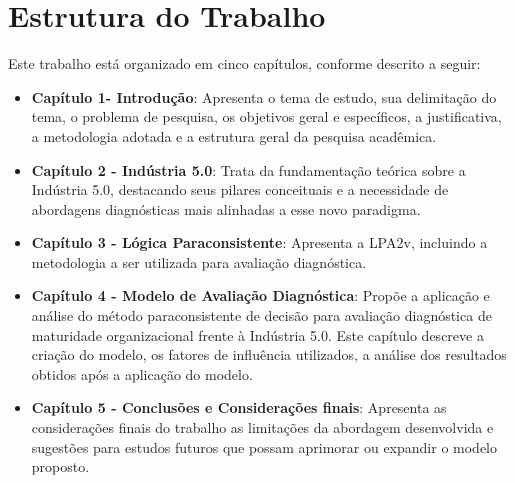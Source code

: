 \section{Estrutura do Trabalho}

Este trabalho está organizado em cinco capítulos, conforme descrito a seguir:

\begin{itemize}
    \item \textbf{Capítulo 1- Introdução}: Apresenta o tema de estudo, sua delimitação do tema, o problema de pesquisa, os objetivos geral e específicos, a justificativa, a metodologia adotada e a estrutura geral da pesquisa acadêmica.
    
    \item \textbf{Capítulo 2 - Indústria 5.0}: Trata da fundamentação teórica sobre a Indústria 5.0, destacando seus pilares conceituais e a necessidade de abordagens diagnósticas mais alinhadas a esse novo paradigma.
    
    \item \textbf{Capítulo 3 - Lógica Paraconsistente}: Apresenta a \gls{LPA2v}, incluindo a metodologia a ser utilizada para avaliação diagnóstica.
    
    \item \textbf{Capítulo 4 - Modelo de Avaliação Diagnóstica}: Propõe a aplicação e análise do método paraconsistente de decisão para avaliação diagnóstica de maturidade organizacional frente à Indústria 5.0.
    Este capítulo descreve a criação do modelo, os fatores de influência utilizados, a análise dos resultados obtidos após a aplicação do modelo.
    
    \item \textbf{Capítulo 5 - Conclusões e Considerações finais}: Apresenta as considerações finais do trabalho as limitações da abordagem desenvolvida e sugestões para estudos futuros que possam aprimorar ou expandir o modelo proposto.
\end{itemize}

